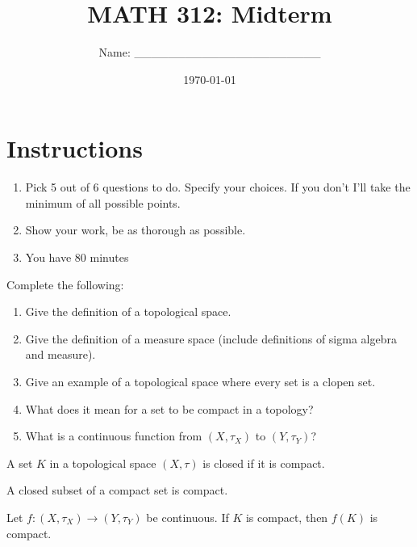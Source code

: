 \documentclass[12pt]{amsart}
\title{ MATH 312: Midterm }
\author{Name: \_\_\_\_\_\_\_\_\_\_\_\_\_\_\_\_\_\_\_\_\_\_}
\date{\today}
\begin{document}
\maketitle


\section*{Instructions}

\begin{enumerate}
	\item Pick 5 out of 6 questions to do. Specify your choices. If you don't I'll take the minimum of all possible points.
	\item Show your work, be as thorough as possible.
	\item You have 80 minutes
\end{enumerate}


\newpage

\begin{question} Complete the following:
	\begin{enumerate}
		\item Give the definition of a topological space.

		\item Give the definition of a measure space (include definitions of sigma algebra and measure).

		\item Give an example of a topological space where every set is a clopen set.

		\item What does it mean for a set to be compact in a topology?

		\item What is a continuous function from $(X, \tau_X)$ to $(Y, \tau_Y)$?
	\end{enumerate}
\end{question}


\begin{question}
	A set $K$ in a topological space $(X, \tau)$ is closed if it is compact.

\end{question}

\begin{question}
	A closed subset of a compact set is compact.
\end{question}

\begin{question}
	Let $f: (X, \tau_X) \to (Y, \tau_Y)$ be continuous.
	If $K$ is compact, then $f(K)$ is compact.
\end{question}
\end{document}
